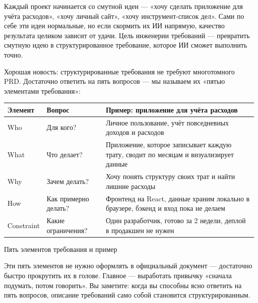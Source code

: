 


Каждый проект начинается со смутной идеи — «хочу сделать приложение для учёта расходов», «хочу личный сайт», «хочу инструмент-список дел». Сами по себе эти идеи нормальные, но если скормить их ИИ напрямую, качество результата целиком зависит от удачи. Цель инженерии требований — превратить смутную идею в структурированное требование, которое ИИ сможет выполнить точно.

Хорошая новость: структурированные требования не требуют многотомного PRD. Достаточно ответить на пять вопросов — мы называем их «пятью элементами требования»:

\begin{center}
\begin{tabularx}{\linewidth}{|X|X|X|}
\hline
\textbf{Элемент} & \textbf{Вопрос} & \textbf{Пример: приложение для учёта расходов} \tabularnewline
\hline
Who & Для кого? & Личное пользование, учёт повседневных доходов и расходов \tabularnewline
What & Что делает? & Приложение, которое записывает каждую трату, сводит по месяцам и визуализирует данные \tabularnewline
Why & Зачем делать? & Хочу понять структуру своих трат и найти лишние расходы \tabularnewline
How & Как примерно делать? & Фронтенд на React, данные храним локально в браузере, бэкенд и вход пока не делаем \tabularnewline
Constraint & Какие ограничения? & Один разработчик, готово за 2 недели, деплой в продакшен не нужен \tabularnewline
\hline
\end{tabularx}
\end{center}

\begin{center}\small\color{gray}Пять элементов требования и пример\end{center}

Эти пять элементов не нужно оформлять в официальный документ — достаточно быстро прокрутить их в голове. Главное — выработать привычку «сначала подумать, потом говорить». Вы заметите: когда вы способны ясно ответить на пять вопросов, описание требований само собой становится структурированным.

